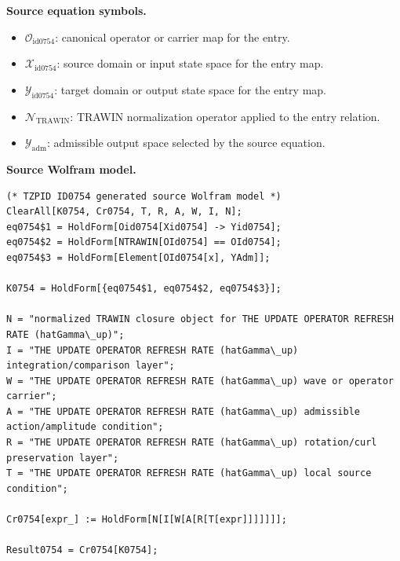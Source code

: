 \begin{minipage}[t]{0.49\linewidth}
\begingroup
\small
\raggedright
\textbf{Source equation symbols.}\par
\begin{itemize}[leftmargin=1.35em,itemsep=1pt,topsep=1pt,parsep=0pt]
    \item $\mathcal{O}_{\mathrm{id0754}}$: canonical operator or carrier map for the entry.
    \item $\mathcal{X}_{\mathrm{id0754}}$: source domain or input state space for the entry map.
    \item $\mathcal{Y}_{\mathrm{id0754}}$: target domain or output state space for the entry map.
    \item $\mathcal{N}_{\mathrm{TRAWIN}}$: TRAWIN normalization operator applied to the entry relation.
    \item $\mathcal{Y}_{\mathrm{adm}}$: admissible output space selected by the source equation.
\end{itemize}
\endgroup
\end{minipage}\hfill
\begin{minipage}[t]{0.47\linewidth}
\begingroup
\scriptsize
\raggedright
\textbf{Source Wolfram model.}\par
\begin{Verbatim}[fontsize=\tiny,breaklines=true,breakanywhere=true]
(* TZPID ID0754 generated source Wolfram model *)
ClearAll[K0754, Cr0754, T, R, A, W, I, N];
eq0754$1 = HoldForm[Oid0754[Xid0754] -> Yid0754];
eq0754$2 = HoldForm[NTRAWIN[OId0754] == OId0754];
eq0754$3 = HoldForm[Element[OId0754[x], YAdm]];

K0754 = HoldForm[{eq0754$1, eq0754$2, eq0754$3}];

N = "normalized TRAWIN closure object for THE UPDATE OPERATOR REFRESH RATE (hatGamma\_up)";
I = "THE UPDATE OPERATOR REFRESH RATE (hatGamma\_up) integration/comparison layer";
W = "THE UPDATE OPERATOR REFRESH RATE (hatGamma\_up) wave or operator carrier";
A = "THE UPDATE OPERATOR REFRESH RATE (hatGamma\_up) admissible action/amplitude condition";
R = "THE UPDATE OPERATOR REFRESH RATE (hatGamma\_up) rotation/curl preservation layer";
T = "THE UPDATE OPERATOR REFRESH RATE (hatGamma\_up) local source condition";

Cr0754[expr_] := HoldForm[N[I[W[A[R[T[expr]]]]]]];

Result0754 = Cr0754[K0754];
\end{Verbatim}
\endgroup
\end{minipage}

